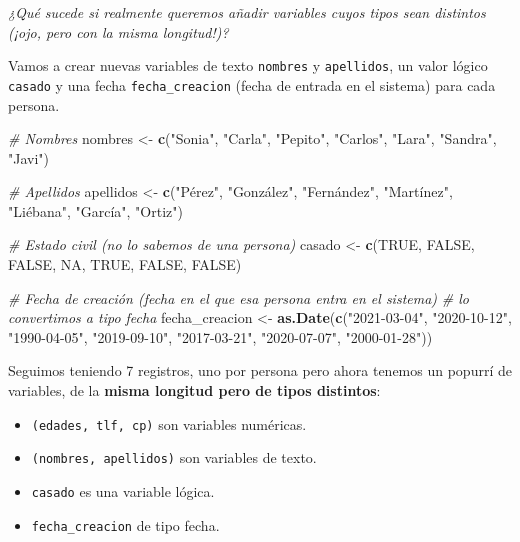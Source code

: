 \documentclass[11pt,]{book}
\newenvironment{Shaded}{\begin{snugshade}}{\end{snugshade}}
\newcommand{\CommentTok}[1]{\textcolor[rgb]{0.37,0.37,0.37}{\textit{#1}}}
\newcommand{\KeywordTok}[1]{\textcolor[rgb]{0.27,0.27,0.27}{\textbf{#1}}}
\newcommand{\NormalTok}[1]{#1}
\newcommand{\OtherTok}[1]{\textcolor[rgb]{0.37,0.37,0.37}{#1}}
\newcommand{\StringTok}[1]{\textcolor[rgb]{0.5,0.5,0.5}{#1}}
\providecommand{\tightlist}{%
  \setlength{\itemsep}{0pt}\setlength{\parskip}{0pt}}
\begin{document}
\emph{¿Qué sucede si realmente queremos añadir variables cuyos tipos sean distintos (¡ojo, pero con la misma longitud!)?}

Vamos a crear nuevas variables de texto \texttt{nombres} y \texttt{apellidos}, un valor lógico \texttt{casado} y una fecha \texttt{fecha\_creacion} (fecha de entrada en el sistema) para cada persona.

\begin{Shaded}
\begin{Highlighting}[]
\CommentTok{# Nombres}
\NormalTok{nombres <-}\StringTok{ }\KeywordTok{c}\NormalTok{(}\StringTok{"Sonia"}\NormalTok{, }\StringTok{"Carla"}\NormalTok{, }\StringTok{"Pepito"}\NormalTok{, }\StringTok{"Carlos"}\NormalTok{, }\StringTok{"Lara"}\NormalTok{, }\StringTok{"Sandra"}\NormalTok{, }\StringTok{"Javi"}\NormalTok{)}

\CommentTok{# Apellidos}
\NormalTok{apellidos <-}\StringTok{ }\KeywordTok{c}\NormalTok{(}\StringTok{"Pérez"}\NormalTok{, }\StringTok{"González"}\NormalTok{, }\StringTok{"Fernández"}\NormalTok{, }\StringTok{"Martínez"}\NormalTok{, }\StringTok{"Liébana"}\NormalTok{, }\StringTok{"García"}\NormalTok{, }\StringTok{"Ortiz"}\NormalTok{)}

\CommentTok{# Estado civil (no lo sabemos de una persona)}
\NormalTok{casado <-}\StringTok{ }\KeywordTok{c}\NormalTok{(}\OtherTok{TRUE}\NormalTok{, }\OtherTok{FALSE}\NormalTok{, }\OtherTok{FALSE}\NormalTok{, }\OtherTok{NA}\NormalTok{, }\OtherTok{TRUE}\NormalTok{, }\OtherTok{FALSE}\NormalTok{, }\OtherTok{FALSE}\NormalTok{)}

\CommentTok{# Fecha de creación (fecha en el que esa persona entra en el sistema)}
\CommentTok{# lo convertimos a tipo fecha}
\NormalTok{fecha_creacion <-}\StringTok{ }\KeywordTok{as.Date}\NormalTok{(}\KeywordTok{c}\NormalTok{(}\StringTok{"2021-03-04"}\NormalTok{, }\StringTok{"2020-10-12"}\NormalTok{, }\StringTok{"1990-04-05"}\NormalTok{,}
                            \StringTok{"2019-09-10"}\NormalTok{, }\StringTok{"2017-03-21"}\NormalTok{, }\StringTok{"2020-07-07"}\NormalTok{,}
                            \StringTok{"2000-01-28"}\NormalTok{))}
\end{Highlighting}
\end{Shaded}

Seguimos teniendo 7 registros, uno por persona pero ahora tenemos un popurrí de variables, de la \textbf{misma longitud pero de tipos distintos}:

\begin{itemize}
\tightlist
\item
  \texttt{(edades,\ tlf,\ cp)} son variables numéricas.
\item
  \texttt{(nombres,\ apellidos)} son variables de texto.
\item
  \texttt{casado} es una variable lógica.
\item
  \texttt{fecha\_creacion} de tipo fecha.
\end{itemize}
\end{document}
